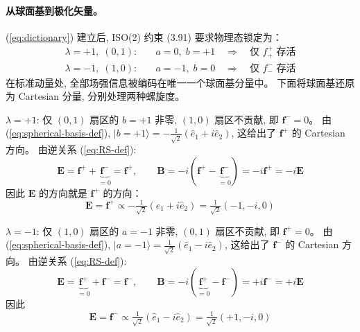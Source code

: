 \paragraph*{从球面基到极化矢量。}(\ref{eq:dictionary}) 建立后, 
ISO(2) 约束 (3.91) 要求物理态锁定为：
\begin{subequations}\label{eq:ISO2-select}
\begin{align}
    \lambda=+1,\;(0,1): &\quad a=0,\;b=+1 
    \quad\Longrightarrow\quad \text{仅 }f^+_+\text{ 存活} \\
    \lambda=-1,\;(1,0): &\quad a=-1,\;b=0 
    \quad\Longrightarrow\quad \text{仅 }f^-_-\text{ 存活}
\end{align}
\end{subequations}
在标准动量处, 全部场强信息被编码在唯一一个球面基分量中。
下面将球面基还原为 Cartesian 分量, 分别处理两种螺旋度。

$\lambda=+1$: 仅 $(0,1)$ 扇区的 $b=+1$ 非零, $(1,0)$ 扇区不贡献, 
即 $\boldsymbol{f}^-=0$。
由 (\ref{eq:spherical-basis-def}), 
$|b=+1\rangle = -\frac{1}{\sqrt{2}}(\hat{e}_1+i\hat{e}_2)$, 
这给出了 $\boldsymbol{f}^+$ 的 Cartesian 方向。
由逆关系 (\ref{eq:RS-def}):
\begin{equation}
    \boldsymbol{E} = \boldsymbol{f}^+ + \underbrace{\boldsymbol{f}^-}_{=0} 
    = \boldsymbol{f}^+, \qquad
    \boldsymbol{B} = -i(\boldsymbol{f}^+ - \underbrace{\boldsymbol{f}^-}_{=0}) 
    = -i\boldsymbol{f}^+ = -i\boldsymbol{E}
\end{equation}
因此 $\boldsymbol{E}$ 的方向就是 $\boldsymbol{f}^+$ 的方向：
\begin{equation}
    \boldsymbol{E} = \boldsymbol{f}^+ 
    \propto -\tfrac{1}{\sqrt{2}}(\hat{e}_1+i\hat{e}_2) 
    = \tfrac{1}{\sqrt{2}}(-1,-i,0)
    \label{eq:E-plus}
\end{equation}

$\lambda=-1$: 仅 $(1,0)$ 扇区的 $a=-1$ 非零, $(0,1)$ 扇区不贡献, 
即 $\boldsymbol{f}^+=0$。
由 (\ref{eq:spherical-basis-def}), 
$|a=-1\rangle = \frac{1}{\sqrt{2}}(\hat{e}_1-i\hat{e}_2)$, 
这给出了 $\boldsymbol{f}^-$ 的 Cartesian 方向。
由逆关系 (\ref{eq:RS-def}):
\begin{equation}
    \boldsymbol{E} = \underbrace{\boldsymbol{f}^+}_{=0} + \boldsymbol{f}^- 
    = \boldsymbol{f}^-, \qquad
    \boldsymbol{B} = -i(\underbrace{\boldsymbol{f}^+}_{=0} - \boldsymbol{f}^-) 
    = +i\boldsymbol{f}^- = +i\boldsymbol{E}
\end{equation}
因此
\begin{equation}
    \boldsymbol{E} = \boldsymbol{f}^- 
    \propto \tfrac{1}{\sqrt{2}}(\hat{e}_1-i\hat{e}_2)
    = \tfrac{1}{\sqrt{2}}(+1,-i,0)
    \label{eq:E-minus}
\end{equation}

